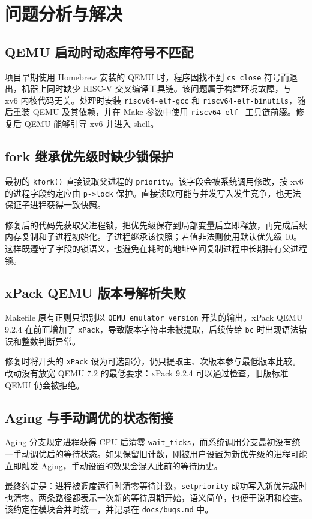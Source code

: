 \chapter{问题分析与解决}

\section{QEMU 启动时动态库符号不匹配}

项目早期使用 Homebrew 安装的 QEMU 时，程序因找不到 \texttt{cs\_close} 符号而退出，机器上同时缺少 RISC-V 交叉编译工具链。该问题属于构建环境故障，与 xv6 内核代码无关。处理时安装 \texttt{riscv64-elf-gcc} 和 \texttt{riscv64-elf-binutils}，随后重装 QEMU 及其依赖，并在 Make 参数中使用 \texttt{riscv64-elf-} 工具链前缀。修复后 QEMU 能够引导 xv6 并进入 shell。

\section{fork 继承优先级时缺少锁保护}

最初的 \texttt{kfork()} 直接读取父进程的 \texttt{priority}。该字段会被系统调用修改，按 xv6 的进程字段约定应由 \texttt{p->lock} 保护。直接读取可能与并发写入发生竞争，也无法保证子进程获得一致快照。

修复后的代码先获取父进程锁，把优先级保存到局部变量后立即释放，再完成后续内存复制和子进程初始化。子进程继承该快照；若值非法则使用默认优先级 10。这样既遵守了字段的锁语义，也避免在耗时的地址空间复制过程中长期持有父进程锁。

\section{xPack QEMU 版本号解析失败}

Makefile 原有正则只识别以 \texttt{QEMU emulator version} 开头的输出。xPack QEMU 9.2.4 在前面增加了 \texttt{xPack}，导致版本字符串未被提取，后续传给 \texttt{bc} 时出现语法错误和整数判断异常。

修复时将开头的 \texttt{xPack} 设为可选部分，仍只提取主、次版本参与最低版本比较。改动没有放宽 QEMU 7.2 的最低要求：xPack 9.2.4 可以通过检查，旧版标准 QEMU 仍会被拒绝。

\section{Aging 与手动调优的状态衔接}

Aging 分支规定进程获得 CPU 后清零 \texttt{wait\_ticks}，而系统调用分支最初没有统一手动调优后的等待状态。如果保留旧计数，刚被用户设置为新优先级的进程可能立即触发 Aging，手动设置的效果会混入此前的等待历史。

最终约定是：进程被调度运行时清零等待计数，\texttt{setpriority} 成功写入新优先级时也清零。两条路径都表示一次新的等待周期开始，语义简单，也便于说明和检查。该约定在模块合并时统一，并记录在 \texttt{docs/bugs.md} 中。
